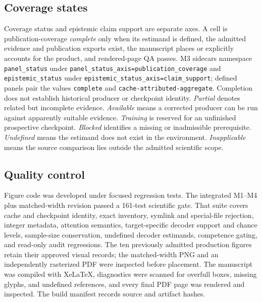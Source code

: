 \documentclass[11pt,a4paper]{article}
\begin{document}
\subsection{Coverage states}
Coverage status and epistemic claim support are separate axes. A cell is publication-coverage \emph{complete} only when its estimand is defined, the admitted evidence and publication exports exist, the manuscript places or explicitly accounts for the product, and rendered-page QA passes. M3 sidecars namespace \texttt{panel\_status} under \texttt{panel\_status\_axis=publication\_coverage} and \texttt{epistemic\_status} under \texttt{epistemic\_status\_axis=claim\_support}; defined panels pair the values \texttt{complete} and \texttt{cache-attributed-aggregate}. Completion does not establish historical producer or checkpoint identity. \emph{Partial} denotes related but incomplete evidence. \emph{Available} means a corrected producer can be run against apparently suitable evidence. \emph{Training} is reserved for an unfinished prospective checkpoint. \emph{Blocked} identifies a missing or inadmissible prerequisite. \emph{Undefined} means the estimand does not exist in the environment. \emph{Inapplicable} means the source comparison lies outside the admitted scientific scope.

\subsection{Quality control}
Figure code was developed under focused regression tests. The integrated M1--M4 plus matched-width revision passed a 161-test scientific gate. That suite covers cache and checkpoint identity, exact inventory, symlink and special-file rejection, integer metadata, attention semantics, target-specific decoder support and chance levels, sample-size conservation, undefined decoder estimands, competence gating, and read-only audit regressions. The ten previously admitted production figures retain their approved visual records; the matched-width PNG and an independently rasterized PDF were inspected before placement. The manuscript was compiled with XeLaTeX, diagnostics were scanned for overfull boxes, missing glyphs, and undefined references, and every final PDF page was rendered and inspected. The build manifest records source and artifact hashes.
\end{document}
